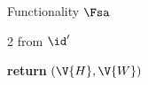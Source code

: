 \begin{interface}[nofloat]{Functionality $\Fsa$ \\
\params{$\PID$, \quad $\Ps$, \quad $\admits$, \quad
$\uses := \{(\Adv,\serves)\}$, \quad $\pars := \none$}}
{\begin{multicols}{2}
 \quad from $\id'$
\begin{algorithmic}[1]
\algcont
\State \textbf{return} $(\V{H}, \V{W})$ \label{ln:saleak}
\algsave
\end{algorithmic}
\end{multicols}}
\end{interface}

